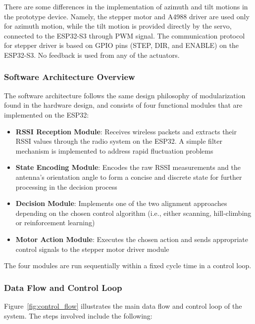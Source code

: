 There are some differences in the implementation of azimuth and tilt motions in
the prototype device. Namely, the stepper motor and A4988 driver are used only
for azimuth motion, while the tilt motion is provided directly by the servo,
connected to the ESP32-S3 through PWM signal. The communication protocol for
stepper driver is based on GPIO pins (STEP, DIR, and ENABLE) on the ESP32-S3.
No feedback is used from any of the actuators.

\subsubsection{Software Architecture Overview}
The software architecture follows the same design philosophy of modularization found in the hardware design, and consists of four functional modules that are implemented on the ESP32:
\begin{itemize}
    \item \textbf{RSSI Reception Module}: Receives wireless packets and extracts their RSSI values through the radio system on the ESP32. A simple filter mechanism is implemented to address rapid fluctuation problems
    
    \item \textbf{State Encoding Module}: Encodes the raw RSSI measurements and the antenna's orientation angle to form a concise and discrete state for further processing in the decision process
    
    \item \textbf{Decision Module}: Implements one of the two alignment approaches depending on the chosen control algorithm (i.e., either scanning, hill-climbing or reinforcement learning)
    
    \item \textbf{Motor Action Module}: Executes the chosen action and sends appropriate control signals to the stepper motor driver module
\end{itemize}

The four modules are run sequentially within a fixed cycle time in a control loop.

\subsubsection{Data Flow and Control Loop}

Figure~\ref{fig:control_flow} illustrates the main data flow and control loop of the system. The steps involved include the following:

